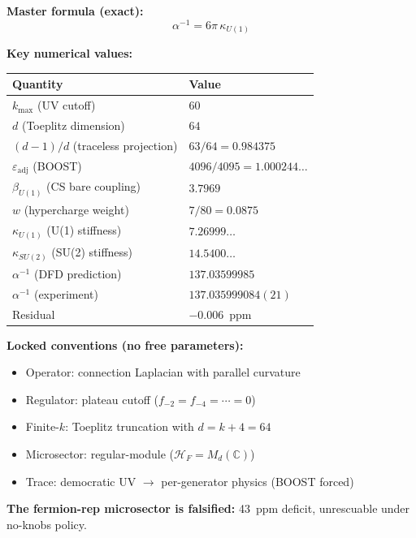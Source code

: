 \documentclass[12pt,a4paper]{article}
\begin{document}
\begin{tcolorbox}[colback=blue!5!white, colframe=blue!50!black,
  title=Summary: The Spectral Action Computation in DFD]

\textbf{Master formula (exact):}
\begin{equation}
\alpha^{-1} = 6\pi\,\kappa_{U(1)}
\end{equation}

\textbf{Key numerical values:}
\begin{center}
\renewcommand{\arraystretch}{1.2}
\begin{tabular}{ll}
\toprule
Quantity & Value \\
\midrule
$k_{\max}$ (UV cutoff) & $60$ \\
$d$ (Toeplitz dimension) & $64$ \\
$(d-1)/d$ (traceless projection) & $63/64 = 0.984375$ \\
$\varepsilon_{\mathrm{adj}}$ (BOOST) & $4096/4095 = 1.000244\ldots$ \\
$\beta_{U(1)}$ (CS bare coupling) & $3.7969$ \\
$w$ (hypercharge weight) & $7/80 = 0.0875$ \\
$\kappa_{U(1)}$ (U(1) stiffness) & $7.26999\ldots$ \\
$\kappa_{SU(2)}$ (SU(2) stiffness) & $14.5400\ldots$ \\
$\alpha^{-1}$ (DFD prediction) & $137.03599985$ \\
$\alpha^{-1}$ (experiment) & $137.035999084(21)$ \\
Residual & $-0.006$~ppm \\
\bottomrule
\end{tabular}
\end{center}

\textbf{Locked conventions (no free parameters):}
\begin{itemize}
\item Operator: connection Laplacian with parallel curvature
\item Regulator: plateau cutoff ($f_{-2} = f_{-4} = \cdots = 0$)
\item Finite-$k$: Toeplitz truncation with $d = k + 4 = 64$
\item Microsector: regular-module ($\mathcal{H}_F = M_d(\mathbb{C})$)
\item Trace: democratic UV $\to$ per-generator physics (BOOST forced)
\end{itemize}

\textbf{The fermion-rep microsector is falsified:}
43~ppm deficit, unrescuable under no-knobs policy.
\end{tcolorbox}
\end{document}
